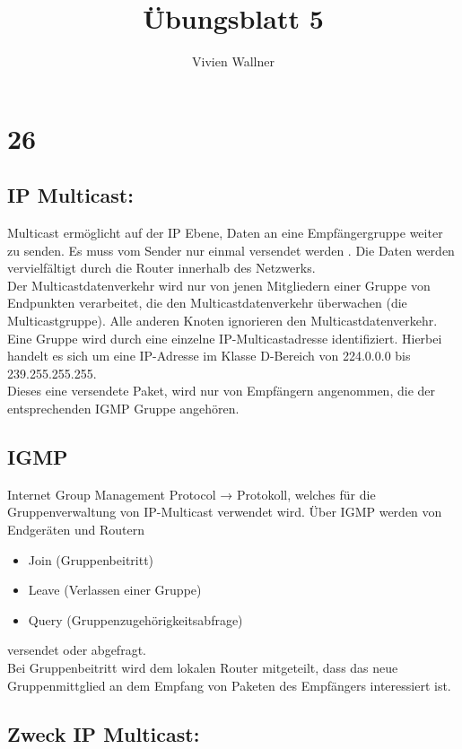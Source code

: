 \documentclass[12pt, a4paper]{article}
\title{Übungsblatt 5}
\author{Vivien Wallner}
\date{}
\begin{document}
	\maketitle

	\section*{26}
	\subsection*{IP Multicast:}
	Multicast ermöglicht auf der IP Ebene, Daten an eine Empfängergruppe weiter zu senden. Es muss vom Sender  nur einmal versendet werden . Die Daten werden vervielfältigt durch die Router innerhalb des Netzwerks.\\
	Der Multicastdatenverkehr wird nur von jenen Mitgliedern einer Gruppe von Endpunkten verarbeitet, die den Multicastdatenverkehr überwachen (die Multicastgruppe). Alle anderen Knoten ignorieren den Multicastdatenverkehr.
	Eine Gruppe wird durch eine einzelne IP-Multicastadresse identifiziert. Hierbei handelt es sich um eine IP-Adresse im Klasse D-Bereich von 224.0.0.0 bis 239.255.255.255.\\
	Dieses eine versendete Paket, wird nur von Empfängern angenommen, die der entsprechenden IGMP Gruppe angehören.\\


	\subsection*{IGMP}
	
	Internet Group Management Protocol → Protokoll, welches für die Gruppenverwaltung von IP-Multicast verwendet wird. Über IGMP werden von Endgeräten und Routern 
	\begin{itemize}
		\item Join (Gruppenbeitritt) 
		\item Leave (Verlassen einer Gruppe)
		\item Query (Gruppenzugehörigkeitsabfrage)
	\end{itemize}
	versendet oder abgefragt.\\
	Bei Gruppenbeitritt wird dem lokalen Router mitgeteilt, dass das neue Gruppenmittglied an dem Empfang von Paketen des Empfängers interessiert ist.


	\subsection*{Zweck IP Multicast:}
\end{document}
